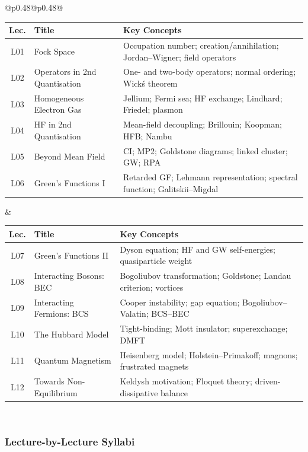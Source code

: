\documentclass[11pt,a4paper]{article}
\begin{document}
\begin{center}
\begin{tabular}{@{}p{}@{\textwidth}p{}@{}}
\begin{tabular}[t]{@{}clp{4.5cm}@{}}
\toprule
\textbf{Lec.} & \textbf{Title} & \textbf{Key Concepts}\\
\midrule
L01 & Fock Space & Occupation number; creation/annihilation; Jordan--Wigner; field operators\\
L02 & Operators in 2nd Quantisation & One- and two-body operators; normal ordering; Wick\'s theorem\\
L03 & Homogeneous Electron Gas & Jellium; Fermi sea; HF exchange; Lindhard; Friedel; plasmon\\
L04 & HF in 2nd Quantisation & Mean-field decoupling; Brillouin; Koopman; HFB; Nambu\\
L05 & Beyond Mean Field & CI; MP2; Goldstone diagrams; linked cluster; GW; RPA\\
L06 & Green's Functions I & Retarded GF; Lehmann representation; spectral function; Galitskii--Migdal\\
\bottomrule
\end{tabular}
&
\begin{tabular}[t]{@{}clp{4.5cm}@{}}
\toprule
\textbf{Lec.} & \textbf{Title} & \textbf{Key Concepts}\\
\midrule
L07 & Green's Functions II & Dyson equation; HF and GW self-energies; quasiparticle weight\\
L08 & Interacting Bosons: BEC & Bogoliubov transformation; Goldstone; Landau criterion; vortices\\
L09 & Interacting Fermions: BCS & Cooper instability; gap equation; Bogoliubov--Valatin; BCS--BEC\\
L10 & The Hubbard Model & Tight-binding; Mott insulator; superexchange; DMFT\\
L11 & Quantum Magnetism & Heisenberg model; Holstein--Primakoff; magnons; frustrated magnets\\
L12 & Towards Non-Equilibrium & Keldysh motivation; Floquet theory; driven-dissipative balance\\
\bottomrule
\end{tabular}
\\
\end{tabular}
\end{center}

\subsubsection*{Lecture-by-Lecture Syllabi}
\end{document}
